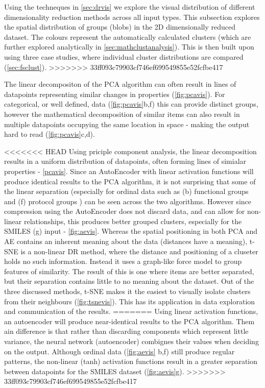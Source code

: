 Using the techneques in \autoref{sec:drvis} we explore the visual distribution of different dimensionality reduction methods across all input types. This subsection explores the spatial distribution of groups (blobs) in the 2D dimensionally reduced dataset. The colours represent the automatically calculated clusters (which are further explored analytically in \autoref{sec:mathclustanalysis}).
This is then built upon using three case studies, where individual cluster distributions are compared (\autoref{sec:fsclust}).
>>>>>>> 33ff093c79903cf746ef699549855e52fcfbe417

The linear decompositon of the PCA algorithm can often result in lines of datapoints representing similar changes in properties (\autoref{fig:pcavis}). For categorical, or well defined, data (\autoref{fig:pcavis}b,f) this can provide distinct groups, however the mathematical decomposition of similar items can also result in multiple datapoints occupying the same location in space - making the output hard to read (\autoref{fig:pcavis}c,d).

<<<<<<< HEAD
Using priciple component analysis, the linear decomposition results in a uniform distribution of datapoints, often forming lines of simialar properties - \autoref{pcavis}. Since an AutoEncoder with linear activation functions will produce identical results to the PCA algorithm, it is not surprising that some of the linear separation (especially for ordinal data such as (b) functional groups and (f) protocol groups ) can be seen across the two algorithms. However since compression using the AutoEncoder does not discard data, and can allow for non-linear relationships, this produces better grouped clusters, especially for the SMILES (g) input - \autoref{fig:aevis}. Whereas the spatial positioning in both PCA and AE contains an inherent meaning about the data (distances have a meaning), t-SNE is a non-linear DR method, where the distance and positioning of a cluseter holds no such information. Instead it uses a graph-like force model to group features of similarity. The result of this is one where items are better separated, but their separation contains little to no meaning about the dataset. Out of the three discussed methods, t-SNE makes it the easiest to visually isolate clusters from their neighbours (\autoref{fig:tsnevis}). This has its application in data exploration and communication of the results.
=======
Using linear activation functions, an autoencoder will produce near-identical results to the PCA algorithm. Them ain difference is that rather than discarding components which represent little variance, the neural network (autoencoder) combignes their values when deciding on the output. Although ordinal data (\autoref{fig:aevis} b,f) still produce regular patterns, the non-linear (tanh) activation functions result in a greater separation between datapoints for the SMILES dataset (\autoref{fig:aevis}g).
>>>>>>> 33ff093c79903cf746ef699549855e52fcfbe417

